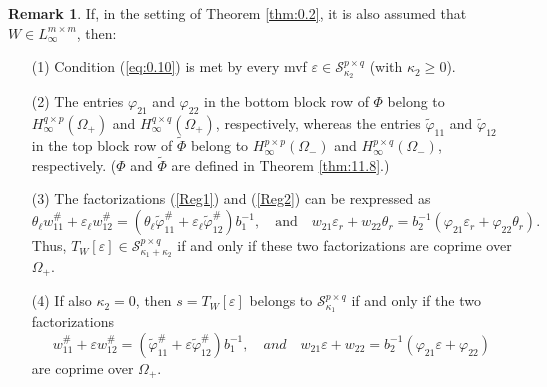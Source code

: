 \documentclass[12pt,twoside,a4paper]{amsart}
\theoremstyle{definition}
\newtheorem{remark}[thm]{Remark}
\numberwithin{equation}{section}
\begin{document}
\begin{remark}
\label{rem:jun18a9}
If, in the setting of Theorem \ref{thm:0.2}, it is also assumed that
$W\in L_\infty^{m\times m}$, then:
\begin{enumerate}
\item[\rm(1)] Condition (\ref{eq:0.10}) is met by every mvf
$\varepsilon\in{{\mathcal S}}_{\kappa_2}^{p\times q}$ (with $\kappa_2\ge 0$).
\item[\rm(2)] The entries $\varphi_{21}$ and $\varphi_{22}$ in the bottom
block row of $\Phi$ belong to $H_\infty^{q\times p}(\Omega_+)$ and
$H_\infty^{q\times q}(\Omega_+)$, respectively, whereas the entries
$\widetilde{\varphi}_{11}$ and $\widetilde{\varphi}_{12}$ in the
top block row of $\widetilde{\Phi}$ belong to $H_\infty^{p\times p}(\Omega_-)$
and $H_\infty^{p\times q}(\Omega_-)$, respectively. ($\Phi$ and
${{{\widetilde {\Phi}} }}$ are defined in
Theorem \ref{thm:11.8}.)
\item[\rm(3)] The factorizations (\ref{Reg1}) and (\ref{Reg2}) can be
rexpressed  as
$$
\theta_\ell w^\#_{11}+\varepsilon_\ell w^\#_{12}
    =(\theta_\ell
{{{\widetilde \varphi} }}_{11}^\#+\varepsilon_\ell{{{\widetilde \varphi} }}_{12}^\#)b_1^{-1},
\quad\textrm{and}\quad
w_{21}\varepsilon_r+ w_{22}\theta_r=b_2^{-1}(\varphi_{21}
\varepsilon_r+\varphi_{22}\theta_r).
$$
Thus, $T_W[\varepsilon]\in{{\mathcal S}}_{\kappa_1+\kappa_2}^{p\times q}$ if
and only if these two factorizations are coprime over $\Omega_+$.
\item[\rm(4)] If also $\kappa_2=0$, then $s=T_W[\varepsilon]$ belongs to
${{\mathcal S}}_{\kappa_1}^{p\times q}$ if
and only if the two factorizations
$$
    w^\#_{11}+\varepsilon w^\#_{12}
    =( {{{\widetilde \varphi} }}_{11}^\#+\varepsilon{{{\widetilde \varphi} }}_{12}^\#)b_1^{-1},
\quad and \quad
w_{21}\varepsilon+ w_{22}=b_2^{-1}(\varphi_{21}\varepsilon+\varphi_{22})
$$
are coprime over $\Omega_+$.
\end{enumerate}
\end{remark}
\end{document}
